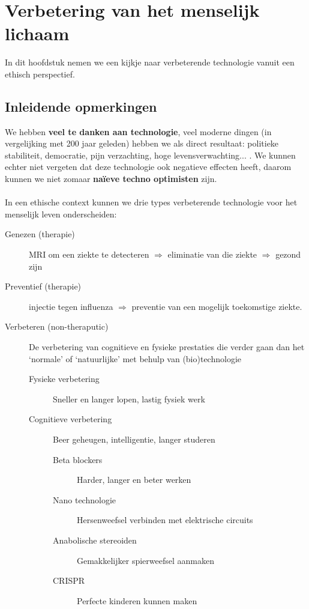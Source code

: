 \documentclass[../summary.tex]{subfiles}
\begin{document}
	
	\section{Verbetering van het menselijk lichaam}
		In dit hoofdstuk nemen we een kijkje naar verbeterende technologie vanuit een ethisch perspectief. 
		\subsection{Inleidende opmerkingen}
			We hebben \textbf{veel te danken aan technologie}, veel moderne dingen (in vergelijking met 200 jaar geleden) hebben we als direct resultaat: politieke stabiliteit, democratie, pijn verzachting, hoge levensverwachting... . We kunnen echter niet vergeten dat deze technologie ook negatieve effecten heeft, daarom kunnen we niet zomaar \textbf{naïeve techno optimisten} zijn. \\
			\\
			In een ethische context kunnen we drie types verbeterende technologie voor het menselijk leven onderscheiden:
			\begin{description}
				\item[Genezen (therapie)] MRI om een ziekte te detecteren $\Rightarrow$ eliminatie van die ziekte $\Rightarrow$ gezond zijn
				\item[Preventief (therapie)] injectie tegen influenza $\Rightarrow$ preventie van een mogelijk toekomstige ziekte. 
				\item[Verbeteren (non-theraputic)] De verbetering van cognitieve en fysieke prestaties die verder gaan dan het `normale' of `natuurlijke' met behulp van (bio)technologie
				\begin{description}
					\item[Fysieke verbetering] Sneller en langer lopen, lastig fysiek werk
					\item[Cognitieve verbetering] Beer geheugen, intelligentie, langer studeren
					\begin{description}
						\item[Beta blockers] Harder, langer en beter werken
						\item[Nano technologie] Hersenweefsel verbinden met elektrische circuits 
						\item[Anabolische stereoiden] Gemakkelijker spierweefsel aanmaken
						\item[CRISPR] Perfecte kinderen kunnen maken %
					\end{description}
				\end{description}
			\end{description}
\end{document}
